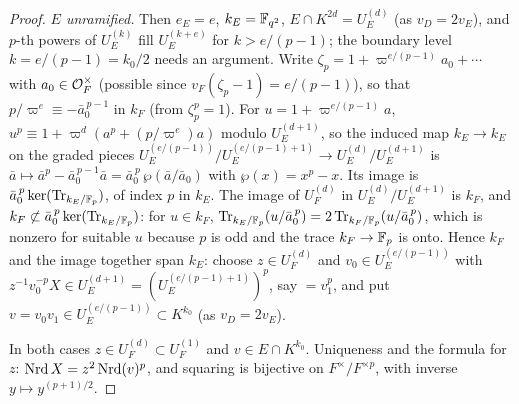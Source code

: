 \begin{proof}
\emph{$E$ unramified.}  Then $e_E=e$, $k_E=\mathbb F_{q^2}$, $E\cap K^{2d}=U_E^{(d)}$
(as $v_D=2v_E$), and $p$-th powers of $U_E^{(k)}$ fill $U_E^{(k+e)}$ for
$k>e/(p-1)$; the boundary level $k=e/(p-1)=k_0/2$ needs an argument.
Write $\zeta_p=1+\varpi^{e/(p-1)}a_0+\cdots$ with $a_0\in\mathcal O_F^\times$
(possible since $v_F(\zeta_p-1)=e/(p-1)$), so that
$p/\varpi^{e}\equiv-\bar a_0^{\,p-1}$ in $k_F$ (from $\zeta_p^p=1$).  For
$u=1+\varpi^{e/(p-1)}a$, $u^p\equiv1+\varpi^d(a^p+(p/\varpi^e)a)$ modulo
$U_E^{(d+1)}$, so the induced map $k_E\to k_E$ on the graded pieces
$U_E^{(e/(p-1))}/U_E^{(e/(p-1)+1)}\to U_E^{(d)}/U_E^{(d+1)}$ is
$\bar a\mapsto\bar a^p-\bar a_0^{\,p-1}\bar a=\bar a_0^{\,p}\,\wp(\bar a/\bar a_0)$
with $\wp(x)=x^p-x$.  Its image is $\bar a_0^{\,p}\ker(\operatorname{Tr}_{k_E/\mathbb F_p})$, of
index $p$ in $k_E$.  The image of $U_F^{(d)}$ in $U_E^{(d)}/U_E^{(d+1)}$
is $k_F$, and $k_F\not\subset\bar a_0^{\,p}\ker(\operatorname{Tr}_{k_E/\mathbb F_p})$: for
$u\in k_F$, $\operatorname{Tr}_{k_E/\mathbb F_p}(u/\bar a_0^{\,p})=2\operatorname{Tr}_{k_F/\mathbb F_p}(u/\bar a_0^{\,p})$,
which is nonzero for suitable $u$ because $p$ is odd and the trace
$k_F\to\mathbb F_p$ is onto.  Hence $k_F$ and the image together span $k_E$:
choose $z\in U_F^{(d)}$ and $v_0\in U_E^{(e/(p-1))}$ with
$z^{-1}v_0^{-p}X\in U_E^{(d+1)}=(U_E^{(e/(p-1)+1)})^p$, say $=v_1^p$, and
put $v=v_0v_1\in U_E^{(e/(p-1))}\subset K^{k_0}$ (as $v_D=2v_E$).

In both cases $z\in U_F^{(d)}\subset U_F^{(1)}$ and $v\in E\cap K^{k_0}$.
Uniqueness and the formula for $z$: $\operatorname{Nrd} X=z^2\operatorname{Nrd}(v)^p$, and squaring
is bijective on $F^\times/F^{\times p}$, with inverse $y\mapsto y^{(p+1)/2}$.
\end{proof}

